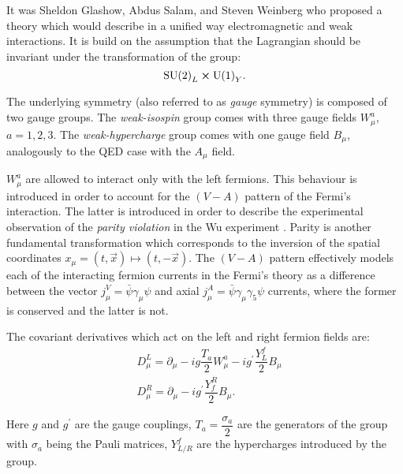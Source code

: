 It was Sheldon Glashow, Abdus Salam, and Steven Weinberg who proposed a theory which would describe in a unified way electromagnetic and weak interactions. It is build on the assumption that the Lagrangian should be invariant under the transformation of the group:
\begin{equation}
    \text{SU(2)}_L \cross \text{U(1)}_Y.
\end{equation}

The underlying symmetry (also referred to as \textit{gauge} symmetry) is composed of two gauge groups. The \textit{weak-isospin} group \sutwo comes with three gauge fields $W^a_\mu$, $a=1,2,3$. The \textit{weak-hypercharge} group \uone comes with one gauge field $B_\mu$, analogously to the QED case with the $A_\mu$ field. 

$W^a_\mu$ are allowed to interact only with the left fermions. This behaviour is introduced in order to account for the $(V-A)$ pattern of the Fermi's interaction. The latter is introduced in order to describe the experimental observation of the \textit{parity violation} in the Wu experiment \cite{PhysRev.105.1413}. Parity is another fundamental transformation which corresponds to the inversion of the spatial coordinates $x_\mu = (t, \vec{x}) \mapsto (t, -\vec{x})$. The $(V-A)$ pattern effectively models each of the interacting fermion currents in the Fermi's theory as a difference between the vector $j_\mu^V = \bar{\psi}\gamma_\mu\psi$ and axial $j_\mu^A = \bar{\psi}\gamma_\mu\gamma_5\psi$ currents, where the former is conserved and the latter is not. 

The covariant derivatives which act on the left and right fermion fields are:
\begin{align}
    &D^L_\mu = \partial_\mu - ig\dfrac{T_a}{2}W^a_\mu - ig^\prime\dfrac{Y_L^f}{2}B_\mu\\
    &D^R_\mu = \partial_\mu - ig^\prime\dfrac{Y^R_f}{2}B_\mu.
\end{align}

Here $g$ and $g^\prime$ are the gauge couplings, $T_a = \dfrac{\sigma_a}{2}$ are the generators of the \sutwo group with $\sigma_a$ being the Pauli matrices, $Y^f_{L/R}$ are the hypercharges introduced by the \uone group. 

